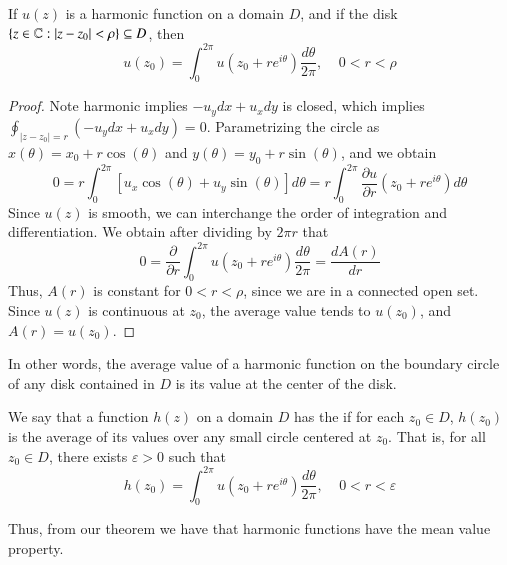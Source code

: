 \documentclass[12pt, a4paper, oneside, openright, titlepage]{book}
\begin{document}
\begin{thm}
    If $u(z)$ is a harmonic function on a domain $D$, and if the disk $\{z \in \mathbb C:|z-z_0| < \rho\} \subseteq D$, then \begin{equation*}
        u(z_0) = \int_0^{2\pi}u(z_0+re^{i\theta})\frac{d\theta}{2\pi}, \;\;\;\; 0 < r < \rho
    \end{equation*}
\end{thm}
\begin{proof}
    Note harmonic implies $-u_ydx+u_xdy$ is closed, which implies $\oint_{|z-z_0| = r}(-u_ydx+u_xdy) = 0$. Parametrizing the circle as $x(\theta) = x_0+r\cos(\theta)$ and $y(\theta) = y_0+r\sin(\theta)$, and we obtain \begin{equation*}
        0 = r\int_{0}^{2\pi}\left[u_x\cos(\theta)+u_y\sin(\theta)\right]d\theta = r\int_0^{2\pi}\frac{\partial u}{\partial r}(z_0+re^{i\theta})d\theta
    \end{equation*}
    Since $u(z)$ is smooth, we can interchange the order of integration and differentiation. We obtain after dividing by $2\pi r$ that \begin{equation*}
        0 = \frac{\partial}{\partial r}\int_0^{2\pi}u(z_0+re^{i\theta})\frac{d\theta}{2\pi} = \frac{dA(r)}{dr}
    \end{equation*}
    Thus, $A(r)$ is constant for $0 < r < \rho$, since we are in a connected open set. Since $u(z)$ is continuous at $z_0$, the average value tends to $u(z_0)$, and $A(r) = u(z_0)$.
\end{proof}


In other words, the average value of a harmonic function on the boundary circle of any disk contained in $D$ is its value at the center of the disk.


\begin{defn}
    We say that a function $h(z)$ on a domain $D$ has the  if for each $z_0 \in D$, $h(z_0)$ is the average of its values over any small circle centered at $z_0$. That is, for all $z_0 \in D$, there exists $\varepsilon > 0$ such that \begin{equation*}
        h(z_0) = \int_0^{2\pi}u(z_0+re^{i\theta})\frac{d\theta}{2\pi},\;\;\;\; 0 < r < \varepsilon
    \end{equation*}
\end{defn}


Thus, from our theorem we have that harmonic functions have the mean value property.



\end{document}
